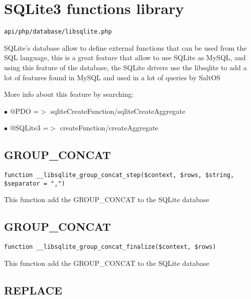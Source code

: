 \documentclass[a4paper]{book}
\begin{document}
\hypertarget{toc306}{}
\section{SQLite3 functions library}

\begin{lstlisting}
api/php/database/libsqlite.php
\end{lstlisting}

SQLite's database allow to define external functions that can be used from the SQL language,
this is a great feature that allow to use SQLite as MySQL, and using this feature of the
database, the SQLite drivers use the libsqlite to add a lot of features found in MySQL and
used in a lot of queries by SaltOS

More info about this feature by searching:

\begin{compactitem}
\item[\color{myblue}$\bullet$] @PDO     =$>$ sqliteCreateFunction/sqliteCreateAggregate
\item[\color{myblue}$\bullet$] @SQLite3 =$>$ createFunction/createAggregate
\end{compactitem}

\hypertarget{toc307}{}
\subsection{GROUP\_CONCAT}

\begin{lstlisting}
function __libsqlite_group_concat_step($context, $rows, $string, $separator = ",")
\end{lstlisting}

This function add the GROUP\_CONCAT to the SQLite database

\hypertarget{toc308}{}
\subsection{GROUP\_CONCAT}

\begin{lstlisting}
function __libsqlite_group_concat_finalize($context, $rows)
\end{lstlisting}

This function add the GROUP\_CONCAT to the SQLite database

\hypertarget{toc309}{}
\subsection{REPLACE}
\end{document}
